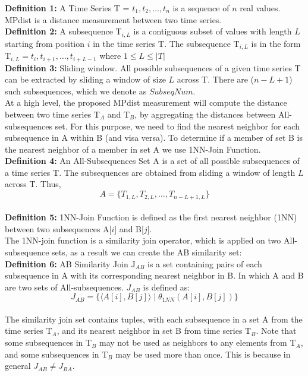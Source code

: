 \textbf{Definition 1:} A Time Series T = $t_1, t_2, \dots, t_n$ is a sequence of $n$ real values. MPdist is a distance measurement between two time series.\\
\textbf{Definition 2:} A subsequence T$_{i,L}$ is a contiguous subset of values with length $L$ starting from position $i$ in the time series T. The subsequence T$_{i,L}$ is in the form T$_{i,L} = t_i, t_{i+1},\dots, t_{i+L-1}$ where $1 \leq L \leq |T|$\\
\textbf{Definition 3:} Sliding window. All possible subsequences of a given time series T can be extracted by sliding a window of size $L$ across T. There are ($n - L + 1$) such subsequences, which we denote as $SubseqNum$.\\
At a high level, the proposed MPdist measurement will compute the distance between two time series T$_A$ and T$_B$, by aggregating the distances between All-subsequences set. For this purpose, we need to find the nearest neighbor for each subsequence in A within B (and visa versa). To determine if a member of set B is the nearest neighbor of a member in set A we use 1NN-Join Function.\\
\textbf{Definition 4:} An All-Subsequences Set A is a set of all possible subsequences of a time series T. The subsequences are obtained from sliding a window of length $L$ across T. Thus,\\
\begin{equation}
A = \{T_{1,L}, T_{2,L},\dots, T_{n-L+1,L}\}
\end{equation}\\
\textbf{Definition 5:} 1NN-Join Function is defined as the first nearest neighbor (1NN) between two subsequences A[$i$] and B[$j$].\\
The 1NN-join function is a similarity join operator, which is applied on two All-subsequence sets, as a result we can create the AB similarity set:\\
\textbf{Definition 6:} AB Similarity Join J$_{AB}$ is a set containing pairs of each subsequence in A with its corresponding nearest neighbor in B. In which A and B are two sets of All-subsequences. $J_{AB}$ is defined as:
\begin{equation}
J_{AB} = \{\langle A[i], B[j]\rangle \; | \; \theta_{1NN}(A[i], B[j])\}
\end{equation}\\
The similarity join set contains tuples, with each subsequence in a set A from the time series T$_A$, and its nearest neighbor in set B from time series T$_B$. Note that some subsequences in T$_B$ may not be used as neighbors to any elements from T$_A$, and some subsequences in T$_B$ may be used more than once. This is because in general $J_{AB} \neq J_{BA}$.\\
